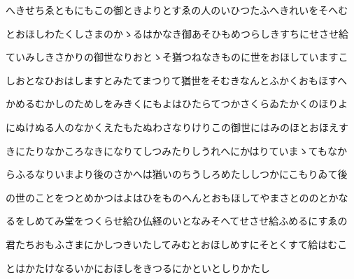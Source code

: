 \documentclass[a4paper,11pt,landscape]{ltjtarticle}
\begin{document}
へきせちゑともにもこの御ときよりとすゑの人のいひつたふへきれいをそへむ
\par\medskip
とおほしわたくしさまのかゝるはかなき御あそひもめつらしきすちにせさせ給
\par\medskip
ていみしきさかりの御世なりおとゝそ猶つねなきものに世をおほしていますこ
\par\medskip
しおとなひおはしますとみたてまつりて猶世をそむきなんとふかくおもほすへ
\par\medskip
かめるむかしのためしをみきくにもよはひたらてつかさくらゐたかくのほりよ
\par\medskip
にぬけぬる人のなかくえたもたぬわさなりけりこの御世にはみのほとおほえす
\par\medskip
きにたりなかころなきになりてしつみたりしうれへにかはりていまゝてもなか
\par\medskip
らふるなりいまより後のさかへは猶いのちうしろめたししつかにこもりゐて後
\par\medskip
の世のことをつとめかつはよはひをものへんとおもほしてやまさとののとかな
\par\medskip
るをしめてみ堂をつくらせ給ひ仏経のいとなみそへてせさせ給ふめるにすゑの
\par\medskip
君たちおもふさまにかしつきいたしてみむとおほしめすにそとくすて給はむこ
\par\medskip
とはかたけなるいかにおほしをきつるにかといとしりかたし
\par\medskip
\end{document}
